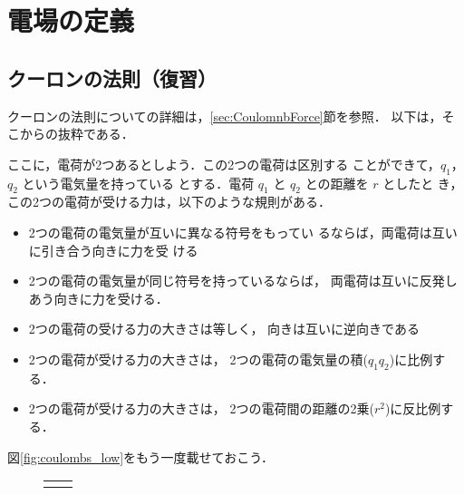     \section{電場の定義}
    \subsection{クーロンの法則（復習）}
        \begin{mycomment}
            クーロンの法則についての詳細は，\ref{sec:CoulomnbForce}節を参照．
            以下は，そこからの抜粋である．
        \end{mycomment}

            ここに，電荷が2つあるとしよう．この2つの電荷は区別する
            ことができて，$q_{1}$，$q_{2}$ という電気量を持っている
            とする．電荷 $q_{1}$ と $q_{2}$ との距離を $r$ としたと
            き，この2つの電荷が受ける力は，以下のような規則がある．
            \begin{itemize}
                \item 2つの電荷の電気量が互いに異なる符号をもってい
                      るならば，両電荷は互いに引き合う向きに力を受
                      ける
                \item 2つの電荷の電気量が同じ符号を持っているならば，
                      両電荷は互いに反発しあう向きに力を受ける．
                \item 2つの電荷の受ける力の大きさは等しく，
                      向きは互いに逆向きである
                \item 2つの電荷が受ける力の大きさは，
                      2つの電荷の電気量の積($q_{1}q_{2}$)に比例する．
                \item 2つの電荷が受ける力の大きさは，
                      2つの電荷間の距離の2乗($r^{2}$)に反比例する．
            \end{itemize}

        図\ref{fig:coulombs_low}をもう一度載せておこう．
        \begin{figure}[hbt]
            \begin{tabular}{cc}
                \begin{minipage}{0.5\hsize}
                    \begin{center}
                        {coulombs_low1.pdf}
                    \end{center}
                \end{minipage}
                \begin{minipage}{0.5\hsize}
                    \begin{center}
                        {coulombs_low2.pdf}
                    \end{center}
                \end{minipage}
            \end{tabular}
        \end{figure}


